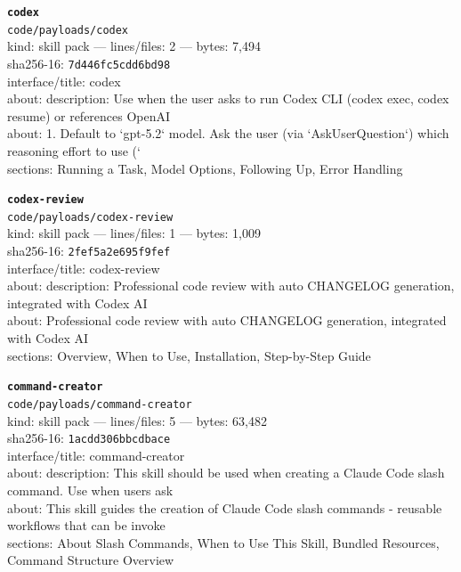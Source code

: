 \noindent\textbf{\texttt{codex}}\\
\texttt{code/payloads/codex}\\
kind: skill pack --- lines/files: 2 --- bytes: 7,494\\
sha256-16: \texttt{7d446fc5cdd6bd98}\\
interface/title: codex\\
about: description: Use when the user asks to run Codex CLI (codex exec, codex resume) or references OpenAI\\
about: 1. Default to `gpt-5.2` model. Ask the user (via `AskUserQuestion`) which reasoning effort to use (`\\
sections: Running a Task, Model Options, Following Up, Error Handling\\
\vspace*{6.0pt}

\noindent\textbf{\texttt{codex-review}}\\
\texttt{code/payloads/codex-review}\\
kind: skill pack --- lines/files: 1 --- bytes: 1,009\\
sha256-16: \texttt{2fef5a2e695f9fef}\\
interface/title: codex-review\\
about: description: Professional code review with auto CHANGELOG generation, integrated with Codex AI\\
about: Professional code review with auto CHANGELOG generation, integrated with Codex AI\\
sections: Overview, When to Use, Installation, Step-by-Step Guide\\
\vspace*{6.0pt}
\newpage

\noindent\textbf{\texttt{command-creator}}\\
\texttt{code/payloads/command-creator}\\
kind: skill pack --- lines/files: 5 --- bytes: 63,482\\
sha256-16: \texttt{1acdd306bbcdbace}\\
interface/title: command-creator\\
about: description: This skill should be used when creating a Claude Code slash command. Use when users ask\\
about: This skill guides the creation of Claude Code slash commands - reusable workflows that can be invoke\\
sections: About Slash Commands, When to Use This Skill, Bundled Resources, Command Structure Overview\\
\vspace*{6.0pt}

